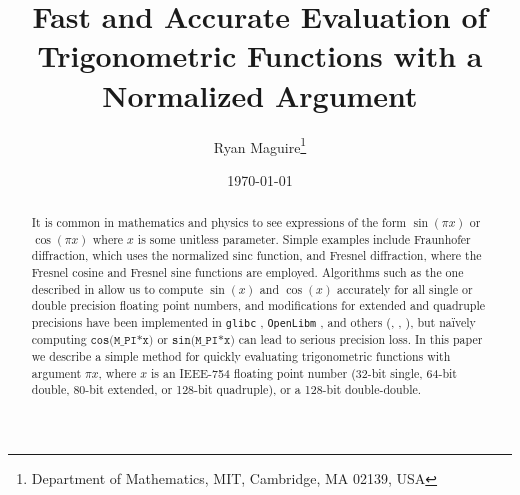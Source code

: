 \documentclass{article}
\title{%
    Fast and Accurate Evaluation of Trigonometric Functions
    with a Normalized Argument
}
\author{%
    Ryan Maguire\footnote{%
        Department of Mathematics,
        MIT, Cambridge, MA 02139, USA
    }
}
\date{\today}
\theoremstyle{plain}
\begin{document}
    \maketitle
    \begin{abstract}
        It is common in mathematics and physics to see expressions of the form
        $\sin(\pi{x})$ or $\cos(\pi{x})$ where $x$ is some unitless
        parameter. Simple examples include Fraunhofer diffraction, which uses
        the normalized $\textrm{sinc}$ function, and Fresnel diffraction, where
        the Fresnel cosine and Fresnel sine functions are employed.
        Algorithms such as the one described in
        \cite{NgArgumentReductionForPi} allow us to compute
        $\sin(x)$ and $\cos(x)$ accurately for all single or double precision
        floating point numbers, and modifications for extended and quadruple
        precisions have been implemented in \texttt{glibc}
        \cite{GLIBC}, \texttt{OpenLibm} \cite{OpenLibm}, and others
        (\cite{FreeBSDmsun},
        \cite{NetlibLibm},
        \cite{OpenBSDLibm}), but na\"{i}vely computing
        $\texttt{cos(M\_PI*x)}$ or $\texttt{sin(M\_PI*x)}$ can lead to
        serious precision loss. In this paper we describe a simple method for
        quickly evaluating trigonometric functions with argument
        $\pi{x}$, where $x$ is an IEEE-754 floating point number
        (32-bit single, 64-bit double, 80-bit extended, or 128-bit quadruple),
        or a 128-bit double-double.
    \end{abstract}
    \tableofcontents
\end{document}
